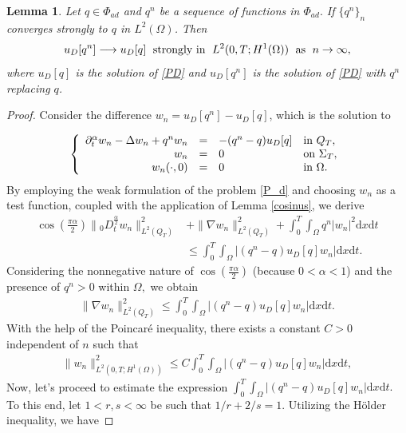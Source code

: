 \documentclass[a4paper,12pt,reqno,natbib]{amsart}
\newtheorem{lemma}[theorem]{Lemma}
\newcommand{\dx} {\displaystyle\mathrm{d}x}
\newcommand{\dt} {\displaystyle\mathrm{d}t}
\def\ds{\displaystyle}
\begin{document}
\begin{lemma} \label{conv_D} Let $q\in\Phi_{ad}$ and $q^n$ be a sequence of functions in $\Phi_{ad}.$ If $\{ q^n \}_n$ converges strongly to  $q$ in $L^2(\Omega)$. Then
\begin{equation*} %
    u_D[q^n]\longrightarrow u_D[q]\; \hbox{ strongly in }\; L^2(0,T;H^1(\Omega))\; \hbox{ as }\; n\to\infty, 
\end{equation*}
where $u_D[q]$ is the solution of \eqref{PD} and $u_D[q^n]$ is the solution of \eqref{PD} with $q^n$ replacing $q$.
\end{lemma}


\begin{proof} Consider the difference $w_n=  u_D[q^n]-  u_D[q]$, which is the solution to

\begin{eqnarray} \label{P_d}
\left\{
  \begin{array}{rcll}
    \partial_{t} ^{\alpha} w_n-\Delta w_n +q^n w_n&=&-(q^n -q)  u_D[q]&\hbox{in}\ Q_T, \\
    \displaystyle w_n&=&0 &\hbox{on}\  \Sigma_T, \\
    \displaystyle w_n(\cdot,0)&=&0  &\hbox{in}\ \Omega.
  \end{array}
\right.
\end{eqnarray}
By employing the weak formulation of the problem \eqref{P_d} and choosing $w_n$ as a test function, coupled with the application of Lemma \ref{cosinus}, we derive
\begin{align*}
    \cos( \frac{\pi\alpha}{2})\|{}_0D^{\frac{\alpha}{2}}_t  w_n\|_{L^2(Q_T)}^2 &+ \|\nabla w_n\|_{L^2(Q_T)}^2 + \int_0^T\int_{\Omega} q^n |w_n|^2 \dx \dt \\&\leq \int_0^T\int_{\Omega}\Big|(q^n -q) u_D[q]w_n\Big| \dx \dt.
\end{align*}
Considering the nonnegative nature of $\displaystyle\cos(\frac{\pi\alpha}{2})$ (because $0<\alpha<1$) and the presence of $ q^n>0$ within $\Omega,$ we obtain
\begin{align*}
     \|\nabla w_n\|_{L^2(Q_T)}^2  \leq \int_0^T\int_{\Omega}\Big|(q^n -q) u_D[q]w_n\Big| \dx \dt.
\end{align*}
With the help of the Poincar\'e  inequality, there exists a constant $C>0$ independent of $n$
such that
\begin{align} \label{h1+}
    \|w_n\|^2_{L^2(0,T;H^1(\Omega))} \leq C \int_0^T\int_{\Omega}\Big|(q^n -q) u_D[q]w_n\Big| \dx \dt,
\end{align}
Now, let's proceed to estimate the expression $\ds\int_0^T\int_{\Omega}\Big|(q^n -q) u_D[q]w_n\Big| \dx \dt.$ To this end, let $1< r,s<\infty$ be such that $1/r+2/s=1.$ Utilizing the H\"{o}lder inequality, we have

\end{proof}
\end{document}
